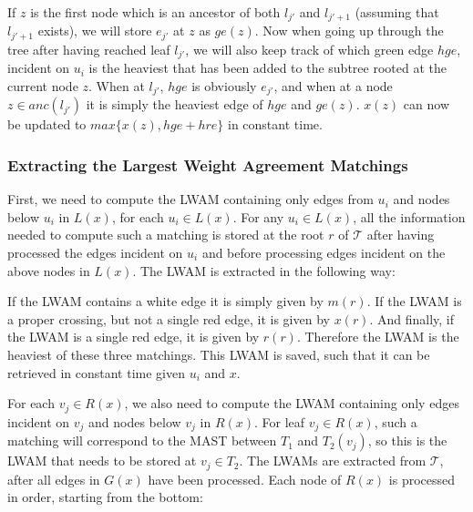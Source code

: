 If $z$ is the first node which is an ancestor of both $l_{j'}$ and $l_{j'+1}$ (assuming that $l_{j'+1}$ exists), we will store $e_{j'}$ at $z$ as $ge(z)$. Now when going up through the tree after having reached leaf $l_{j'}$, we will also keep track of which green edge $hge$, incident on $u_i$ is the heaviest that has been added to the subtree rooted at the current node $z$. When at $l_{j'}$, $hge$ is obviously $e_{j'}$, and when at a node $z \in anc(l_{j'})$ it is simply the heaviest edge of $hge$ and $ge(z)$. $x(z)$ can now be updated to $max\{x(z), hge + hre\}$ in constant time.

\subsubsection{Extracting the Largest Weight Agreement Matchings}
First, we need to compute the LWAM containing only edges from $u_i$ and nodes below $u_i$ in $L(x)$, for each $u_i \in L(x)$. For any $u_i \in L(x)$, all the information needed to compute such a matching is stored at the root $r$ of $\mathcal{T}$ after having processed the edges incident on $u_i$ and before processing edges incident on the above nodes in $L(x)$. The LWAM is extracted in the following way:

If the LWAM contains a white edge it is simply given by $m(r)$. If the LWAM is a proper crossing, but not a single red edge, it is given by $x(r)$. And finally, if the LWAM is a single red edge, it is given by $r(r)$. Therefore the LWAM is the heaviest of these three matchings. This LWAM is saved, such that it can be retrieved in constant time given $u_i$ and $x$. 

For each $v_j \in R(x)$, we also need to compute the LWAM containing only edges incident on $v_j$ and nodes below $v_j$ in $R(x)$. For leaf $v_j \in R(x)$, such a matching will correspond to the MAST between $T_1$ and $T_2(v_j)$, so this is the LWAM that needs to be stored at $v_j \in T_2$. The LWAMs are extracted from $\mathcal{T}$, after all edges in $G(x)$ have been processed. Each node of $R(x)$ is processed in order, starting from the bottom:

